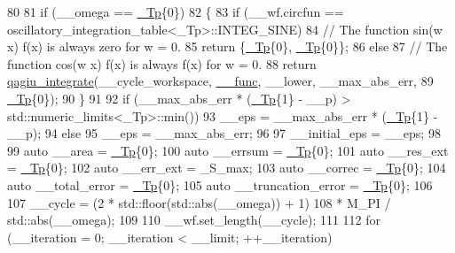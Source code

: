 \begin{DoxyCode}
80 
81       \textcolor{keywordflow}{if} (\_\_omega == \hyperlink{namespace____gnu__cxx_a3b19a9c800ca194374ef9172290f7d79}{\_Tp}\{0\})
82         \{
83           \textcolor{keywordflow}{if} (\_\_wf.circfun == oscillatory\_integration\_table<\_Tp>::INTEG\_SINE)
84             \textcolor{comment}{// The function sin(w x) f(x) is always zero for w = 0.}
85             \textcolor{keywordflow}{return} \{\hyperlink{namespace____gnu__cxx_a3b19a9c800ca194374ef9172290f7d79}{\_Tp}\{0\}, \hyperlink{namespace____gnu__cxx_a3b19a9c800ca194374ef9172290f7d79}{\_Tp}\{0\}\};
86           \textcolor{keywordflow}{else}
87             \textcolor{comment}{// The function cos(w x) f(x) is always f(x) for w = 0.}
88             \textcolor{keywordflow}{return} \hyperlink{namespace____gnu__cxx_acd07d4a9a1757bea02df44089a2a96bf}{qagiu\_integrate}(\_\_cycle\_workspace, \hyperlink{namespace____gnu__cxx_af2b2f0c7a2ae72b922b1afefae5a65b2}{\_\_func}, \_\_lower, \_\_max\_abs\_err,
89                                    \hyperlink{namespace____gnu__cxx_a3b19a9c800ca194374ef9172290f7d79}{\_Tp}\{0\});
90         \}
91 
92       \textcolor{keywordflow}{if} (\_\_max\_abs\_err * (\hyperlink{namespace____gnu__cxx_a3b19a9c800ca194374ef9172290f7d79}{\_Tp}\{1\} - \_\_p) > std::numeric\_limits<\_Tp>::min())
93         \_\_eps = \_\_max\_abs\_err * (\hyperlink{namespace____gnu__cxx_a3b19a9c800ca194374ef9172290f7d79}{\_Tp}\{1\} - \_\_p);
94       \textcolor{keywordflow}{else}
95         \_\_eps = \_\_max\_abs\_err;
96 
97       \_\_initial\_eps = \_\_eps;
98 
99       \textcolor{keyword}{auto} \_\_area = \hyperlink{namespace____gnu__cxx_a3b19a9c800ca194374ef9172290f7d79}{\_Tp}\{0\};
100       \textcolor{keyword}{auto} \_\_errsum = \hyperlink{namespace____gnu__cxx_a3b19a9c800ca194374ef9172290f7d79}{\_Tp}\{0\};
101       \textcolor{keyword}{auto} \_\_res\_ext = \hyperlink{namespace____gnu__cxx_a3b19a9c800ca194374ef9172290f7d79}{\_Tp}\{0\};
102       \textcolor{keyword}{auto} \_\_err\_ext = \_S\_max;
103       \textcolor{keyword}{auto} \_\_correc = \hyperlink{namespace____gnu__cxx_a3b19a9c800ca194374ef9172290f7d79}{\_Tp}\{0\};
104       \textcolor{keyword}{auto} \_\_total\_error = \hyperlink{namespace____gnu__cxx_a3b19a9c800ca194374ef9172290f7d79}{\_Tp}\{0\};
105       \textcolor{keyword}{auto} \_\_truncation\_error = \hyperlink{namespace____gnu__cxx_a3b19a9c800ca194374ef9172290f7d79}{\_Tp}\{0\};
106 
107       \_\_cycle = (2 * std::floor(std::abs(\_\_omega)) + 1)
108               * M\_PI / std::abs(\_\_omega);
109 
110       \_\_wf.set\_length(\_\_cycle);
111 
112       \textcolor{keywordflow}{for} (\_\_iteration = 0; \_\_iteration < \_\_limit; ++\_\_iteration)

\end{DoxyCode}
